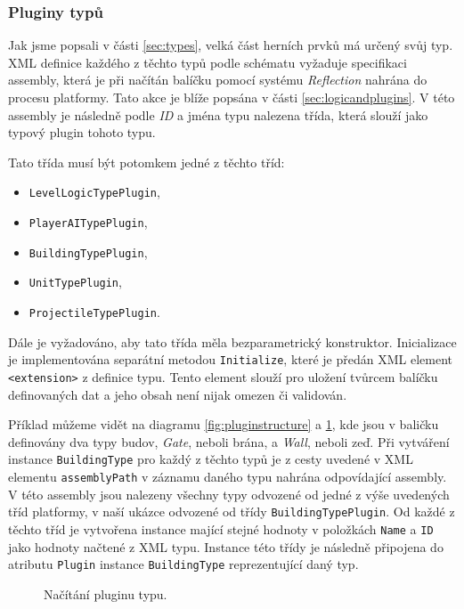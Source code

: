 \subsubsection{Pluginy typů}
\label{sec:typeplugins}
Jak jsme popsali v části \ref{sec:types}, velká část herních prvků má určený svůj typ. XML definice každého z těchto typů podle schématu vyžaduje specifikaci assembly, která je při načítán balíčku pomocí systému \textit{Reflection} nahrána do procesu platformy. Tato akce je blíže popsána v části \ref{sec:logicandplugins}. V této assembly je následně podle \textit{ID} a jména typu nalezena třída, která slouží jako typový plugin tohoto typu. 

Tato třída musí být potomkem jedné z těchto tříd:
\begin{itemize}
	\item \texttt{LevelLogicTypePlugin},
	\item \texttt{PlayerAITypePlugin},
	\item \texttt{BuildingTypePlugin},
	\item \texttt{UnitTypePlugin},
	\item \texttt{ProjectileTypePlugin}.
\end{itemize}

Dále je vyžadováno, aby tato třída měla bezparametrický konstruktor. Inicializace je implementována separátní metodou \texttt{Initialize}, které je předán XML element \texttt{<extension>} z definice typu. Tento element slouží pro uložení tvůrcem balíčku definovaných dat a jeho obsah není nijak omezen či validován.

Příklad můžeme vidět na diagramu \ref{fig:pluginstructure} a \ref{fig:typeplugincreation}, kde jsou v baličku definovány dva typy budov, \textit{Gate}, neboli brána, a \textit{Wall}, neboli zeď. Při vytváření instance \texttt{BuildingType} pro každý z těchto typů je z cesty uvedené v XML elementu \texttt{assemblyPath} v záznamu daného typu nahrána odpovídající assembly. V této assembly jsou nalezeny všechny typy odvozené od jedné z výše uvedených tříd platformy, v naší ukázce odvozené od třídy \texttt{BuildingTypePlugin}. Od každé z těchto tříd je vytvořena instance mající stejné hodnoty v položkách \texttt{Name} a \texttt{ID} jako hodnoty načtené z XML typu. Instance této třídy je následně připojena do atributu \texttt{Plugin} instance \texttt{BuildingType} reprezentující daný typ.

\begin{figure}[h]
	\centering
	\fontsize{8pt}{11pt}\selectfont
	\def\svgwidth{\textwidth}
	
	\caption{Načítání pluginu typu.}
	\label{fig:typeplugincreation}
\end{figure}

